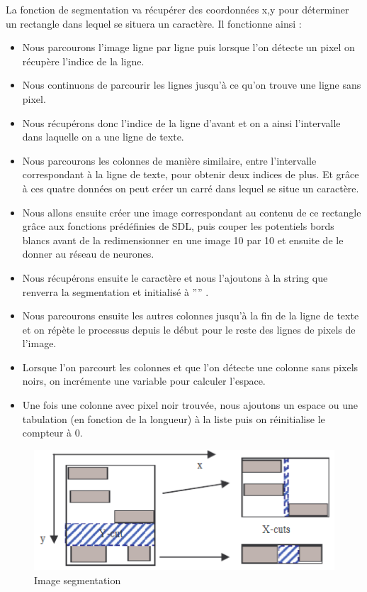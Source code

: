 \documentclass[12pt]{report}
\begin{document}
La fonction de segmentation va récupérer des coordonnées x,y pour déterminer un rectangle dans lequel se situera un caractère. Il fonctionne ainsi : 
\begin{itemize}[label=\textbullet]
	\item Nous parcourons l'image ligne par ligne puis lorsque l'on détecte un pixel on récupère l'indice de la ligne.
	\item Nous continuons de parcourir les lignes jusqu'à ce qu'on trouve une ligne sans pixel.
	\item Nous récupérons donc l'indice de la ligne d'avant et on a ainsi l'intervalle dans laquelle on a une ligne de texte.
	\item Nous parcourons les colonnes de manière similaire, entre l'intervalle correspondant à la ligne de texte, pour obtenir deux indices de plus. Et grâce à ces quatre données on peut créer un carré dans lequel se situe un caractère.
	\item Nous allons ensuite créer une image correspondant au contenu de ce rectangle grâce aux fonctions prédéfinies de SDL, puis couper les potentiels bords blancs avant de la redimensionner en une image 10 par 10 et ensuite de le donner au réseau de neurones. 
	\item Nous récupérons ensuite le caractère et nous l'ajoutons à la string que renverra la segmentation et initialisé à '''' .
	\item Nous parcourons ensuite les autres colonnes jusqu'à la fin de la ligne de texte et on répète le processus depuis le début pour le reste des lignes de pixels de l'image.
	\item Lorsque l'on parcourt les colonnes et que l'on détecte une colonne sans pixels noirs, on incrémente une variable pour calculer l'espace. 
	\item Une fois une colonne avec pixel noir trouvée, nous ajoutons un espace ou une tabulation (en fonction de la longueur) à la liste puis on réinitialise le compteur à 0.
\end{itemize}

\begin{figure}
    \centering
    \includegraphics[width=1\textwidth]{Image_segmentation}
    \caption{Image segmentation}
\end{figure}
\end{document}
